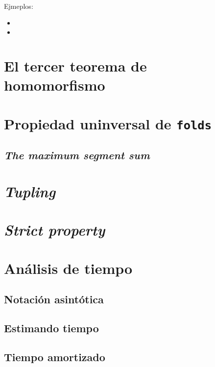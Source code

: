 Ejmeplos:
\begin{itemize}
    \item {}
    \item {}
\end{itemize}





\section{El tercer teorema de homomorfismo}
\cite{Gibbons96:Third}

\section{Propiedad uninversal de \texttt{folds}}
\cite{univ_expre_fold}

\subsection{\textit{The maximum segment sum}}

\section{\textit{Tupling}}
\section{\textit{Strict property}}



\section{Análisis de tiempo}

\subsection{Notación asintótica}

\subsection{Estimando tiempo}

\subsection{Tiempo amortizado}

